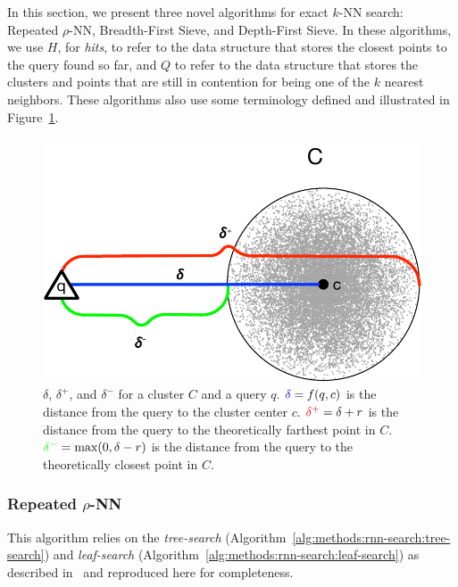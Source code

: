 In this section, we present three novel algorithms for exact $k$-NN search:
Repeated $\rho$-NN, Breadth-First Sieve, and Depth-First Sieve.
In these algorithms, we use $H$, for \textit{hits}, to refer to the data structure that stores the closest points to the query found so far, and $Q$ to refer to the data structure that stores the clusters and points that are still in contention for being one of the $k$ nearest neighbors.
These algorithms also use some terminology defined and illustrated in Figure~\ref{fig:methods:deltas}.

\begin{figure}[H]
    \centering
    \includegraphics[scale=0.65]{images/geometry/deltas.pdf}
    \caption{
        {\color{blue}$\delta$}, {\color{red}$\delta^{+}$}, and {\color{green}$\delta^{-}$} for a cluster $C$ and a query $q$.
        ${\color{blue}\delta} = f(q, c)$ is the distance from the query to the cluster center $c$.
        ${\color{red}\delta^{+}} = \delta + r$ is the distance from the query to the theoretically farthest point in $C$.
        ${\color{green}\delta^{-}} = \text{max}(0, \delta - r)$ is the distance from the query to the theoretically closest point in $C$.
    }
    \label{fig:methods:deltas}
    \vskip -0.25in
\end{figure}


\subsubsection{Repeated \texorpdfstring{$\rho$}{p}-NN}
\label{sec:methods:knn-search:repeated-rnn}

This algorithm relies on the \textit{tree-search} (Algorithm~\ref{alg:methods:rnn-search:tree-search}) and \textit{leaf-search} (Algorithm~\ref{alg:methods:rnn-search:leaf-search}) as described in~\cite{ishaq2019clustered} and reproduced here for completeness.

